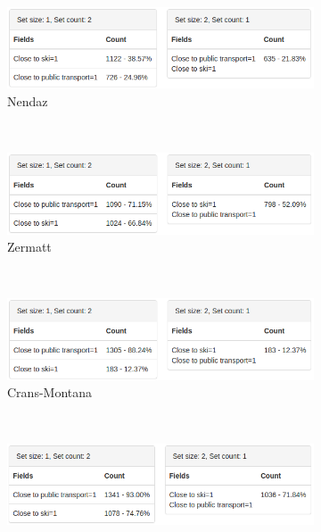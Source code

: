 \begin{figure}[htb]
	\begin{subfigure}[t]{0.8\textwidth}
		\centering
		\includegraphics[width=1\textwidth]{images/hypothese5-nendaz}
		\caption{Nendaz}
		\label{sec:testingfazit:testing:hypothesen:5:1}
	\end{subfigure}  \\
	\begin{subfigure}[t]{0.8\textwidth}
		\centering
		\includegraphics[width=1\textwidth]{images/hypothese5-zermatt}
		\caption{Zermatt}
		\label{sec:testingfazit:testing:hypothesen:5:2}
	\end{subfigure} \\
	\begin{subfigure}[t]{0.8\textwidth}
		\centering
		\includegraphics[width=1\textwidth]{images/hypothese5-crans-montana}
		\caption{Crans-Montana}
		\label{sec:testingfazit:testing:hypothesen:5:3}
	\end{subfigure} \\
	\begin{subfigure}[t]{0.8\textwidth}
		\centering
		\includegraphics[width=1\textwidth]{images/hypothese5-grindelwald}

\end{subfigure}
\end{figure}
